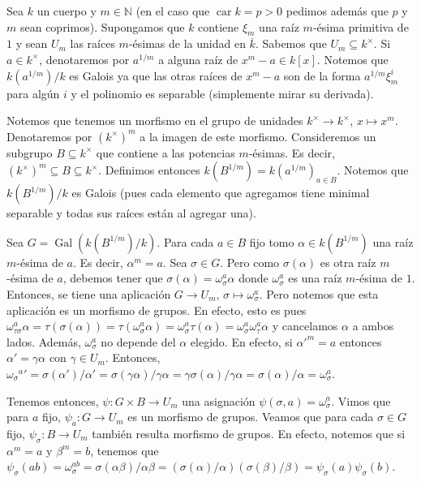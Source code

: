 \documentclass[12pt]{book}
\theoremstyle{definition}
\newcommand{\NN}{\mathbb{N}}
\DeclareMathOperator{\car}{car}
\DeclareMathOperator{\Gal}{Gal}
\begin{document}
Sea $k$ un cuerpo y $m\in\NN$ (en el caso que $\car k = p>0$ pedimos además que $p$ y $m$ sean coprimos). Supongamos que $k$ contiene $\xi_m$ una raíz $m$-ésima primitiva de $1$ y sean $U_m$ las raíces $m$-ésimas de la unidad en $\overline{k}$. Sabemos que $U_m\subseteq k^\times$. Si $a\in k^\times$, denotaremos por $a^{1/m}$ a alguna raíz de $x^m - a\in k[x]$. Notemos que $k(a^{1/m})/k$ es Galois ya que las otras raíces de $x^m - a$ son de la forma $a^{1/m}\xi_m^i$ para algún $i$ y el polinomio es separable (simplemente mirar su derivada).

Notemos que tenemos un morfismo en el grupo de unidades $k^\times\to k^\times$, $x\mapsto x^m$. Denotaremos por $(k^\times)^m$ a la imagen de este morfismo. Consideremos un subgrupo $B\subseteq k^\times$ que contiene a las potencias $m$-ésimas. Es decir, $(k^\times)^m \subseteq B\subseteq k^\times$. Definimos entonces $k(B^{1/m})=k(a^{1/m})_{a\in B}$. Notemos que $k(B^{1/m})/k$ es Galois (pues cada elemento que agregamos tiene minimal separable y todas sus raíces están al agregar una).

Sea $G=\Gal(k(B^{1/m})/k)$. Para cada $a\in B$ fijo tomo $\alpha\in k(B^{1/m})$ una raíz $m$-ésima de $a$. Es decir, $\alpha^m = a$. Sea $\sigma\in G$. Pero como $\sigma(\alpha)$ es otra raíz $m$-ésima de $a$, debemos tener que $\sigma(\alpha)=\omega_\sigma^a \alpha$ donde $\omega_\sigma^a$ es una raíz $m$-ésima de $1$. Entonces, se tiene una aplicación $G\to U_m$, $\sigma\mapsto \omega_\sigma^a$. Pero notemos que esta aplicación es un morfismo de grupos. En efecto, esto es pues $\omega_{\tau\sigma}^a\alpha = \tau(\sigma(\alpha)) = \tau(\omega_\sigma^a \alpha) = \omega_\sigma^a \tau(\alpha) = \omega_\sigma^a \omega_\tau^a \alpha$ y cancelamos $\alpha$ a ambos lados. Además, $\omega_\sigma^a$ no depende del $\alpha$ elegido. En efecto, si $\alpha'^m = a$ entonces $\alpha' = \gamma\alpha$ con $\gamma\in U_m$. Entonces, ${{\omega_{\sigma}}^a}' = \sigma(\alpha')/\alpha' = \sigma(\gamma\alpha)/\gamma\alpha = \gamma\sigma(\alpha)/\gamma\alpha = \sigma(\alpha)/\alpha = \omega_\sigma^a$.

Tenemos entonces, $\psi:G\times B\to U_m$ una asignación $\psi(\sigma,a) = \omega_\sigma^a$. Vimos que para $a$ fijo, $\psi_a:G\to U_m$ es un morfismo de grupos. Veamos que para cada $\sigma\in G$ fijo, $\psi_\sigma:B\to U_m$ también resulta morfismo de grupos. En efecto, notemos que si $\alpha^m = a$ y $\beta^m = b$, tenemos que $\psi_\sigma(ab) = \omega_\sigma^{ab} = \sigma(\alpha\beta)/\alpha\beta = (\sigma(\alpha)/\alpha)( \sigma(\beta)/\beta) = \psi_\sigma(a)\psi_\sigma(b)$.
\end{document}
